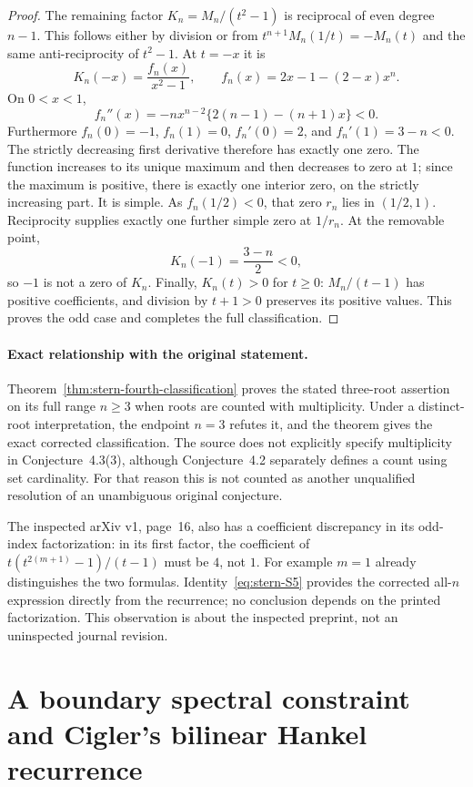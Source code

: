 \documentclass[11pt,a4paper]{article}
\theoremstyle{definition}\newtheorem{definition}[theorem]{Definition}
\theoremstyle{remark}\newtheorem{remark}[theorem]{Remark}
\begin{document}
\begin{proof}
The remaining factor $K_n=M_n/(t^2-1)$ is reciprocal of even degree
$n-1$. This follows either by division or from
$t^{n+1}M_n(1/t)=-M_n(t)$ and the same anti-reciprocity of $t^2-1$.
At $t=-x$ it is
\[
 K_n(-x)=\frac{f_n(x)}{x^2-1},\qquad
 f_n(x)=2x-1-(2-x)x^n.
\]
On $0<x<1$,
\[
 f_n''(x)=-n x^{n-2}\{2(n-1)-(n+1)x\}<0.
\]
Furthermore $f_n(0)=-1$, $f_n(1)=0$,
$f_n'(0)=2$, and $f_n'(1)=3-n<0$. The strictly decreasing
first derivative therefore has exactly one zero. The function increases
to its unique maximum and then decreases to zero at $1$; since the
maximum is positive, there is exactly one interior zero, on the strictly
increasing part. It is simple. As $f_n(1/2)<0$, that zero $r_n$ lies
in $(1/2,1)$. Reciprocity supplies exactly one further simple zero
at $1/r_n$. At the removable point,
\[
 K_n(-1)=\frac{3-n}{2}<0,
\]
so $-1$ is not a zero of $K_n$. Finally, $K_n(t)>0$ for $t\geq0$:
$M_n/(t-1)$ has positive coefficients, and division by $t+1>0$ preserves
its positive values. This proves the odd case and completes the full
classification.
\end{proof}

\paragraph{Exact relationship with the original statement.}
Theorem~\ref{thm:stern-fourth-classification} proves the stated
three-root assertion on its full range $n\geq3$ when roots are counted
with multiplicity. Under a distinct-root interpretation, the endpoint
$n=3$ refutes it, and the theorem gives the exact corrected classification.
The source does not explicitly specify multiplicity in Conjecture~4.3(3),
although Conjecture~4.2 separately defines a count using set cardinality.
For that reason this is not counted as another unqualified resolution of
an unambiguous original conjecture.

The inspected arXiv v1, page~16, also has a coefficient discrepancy in its
odd-index factorization: in its first factor, the coefficient of
$t(t^{2(m+1)}-1)/(t-1)$ must be $4$, not $1$. For example $m=1$
already distinguishes the two formulas. Identity~\eqref{eq:stern-S5}
provides the corrected all-$n$ expression directly from the recurrence;
no conclusion depends on the printed factorization. This observation is
about the inspected preprint, not an uninspected journal revision.

\section{A boundary spectral constraint and Cigler's bilinear Hankel recurrence}
\label{sec:cigler-boundary}
\end{document}
